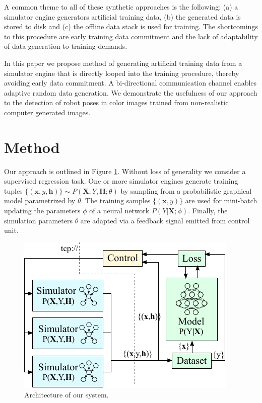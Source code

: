 \documentclass[conference]{IEEEtran}
\begin{document}
A common theme to all of these synthetic approaches is the following: (a) a simulator engine generators artificial training data, (b) the generated data is stored to disk and (c) the offline data stack is used for training. The shortcomings to this procedure are early training data commitment and the lack of adaptability of data generation to training demands.

In this paper we propose method of generating artificial training data from a simulator engine that is directly looped into the training procedure, thereby avoiding early data commitment. A bi-directional communication channel enables adaptive random data generation. We demonstrate the usefulness of our approach to the detection of robot poses in color images trained from non-realistic computer generated images.




\section{Method}

    Our approach is outlined in Figure \ref{fig:architecture}. Without loss of generality we consider a supervised regression task. One or more simulator engines generate training tuples $\{(\textbf{x},y,\textbf{h})\} \sim P(\textbf{X},Y,\textbf{H};\theta)$ by sampling from a probabilistic graphical model parametrized by $\theta$. The training samples $\{(\textbf{x},y)\}$ are used for mini-batch updating the parameters $\phi$ of a neural network $P(Y \lvert \textbf{X};\phi)$. Finally, the simulation parameters $\theta$ are adapted via a feedback signal emitted from control unit.

    \begin{figure}[htbp]
        \centerline{\includegraphics[width=0.9\columnwidth]{figures/architecture/overview.pdf}}
        \caption{\label{fig:architecture} Architecture of our system.}
    \end{figure}
\end{document}
